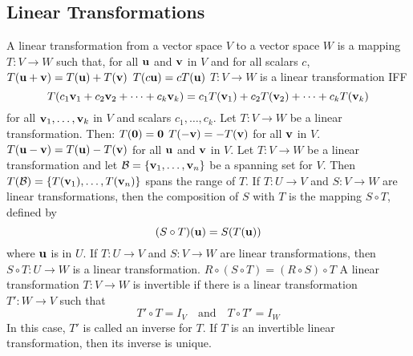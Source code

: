 \documentclass{article}
\begin{document}
        \subsection{Linear Transformations}
        \begin{outline}
            \1 A linear transformation from a vector space $V$ to a vector space $W$ is a mapping \(T:V\to W\) such that, for all \(\vb u\) and \(\vb v\) in $V$ and for all scalars $c$, 
                \2 \(T(\vb u+\vb v)=T(\vb u)+T(\vb v)\)
                \2 \(T(c\vb u)=cT(\vb u)\)
            \1 \(T:V\to W\) is a linear transformation IFF \[T(c_1\vb v_1+c_2\vb v_2+\cdots+c_k\vb v_k)=c_1T(\vb v_1)+c_2T(\vb v_2)+\cdots+c_kT(\vb v_k)\] for all \(\vb v_1,\ldots,\vb v_k\) in $V$ and scalars \(c_1,\ldots,c_k\). 
            \1 Let \(T:V\to W\) be a linear transformation. Then: 
                \2 \(T(\vb 0)=\vb 0\)
                \2 \(T(-\vb v)=-T(\vb v)\) for all \(\vb v\) in $V$. 
                \2 \(T(\vb u-\vb v)=T(\vb u)-T(\vb v)\) for all \(\vb u\) and \(\vb v\) in $V$. 
            \1 Let \(T:V\to W\) be a linear transformation and let \(\mathcal B=\{\vb v_1,\ldots,\vb v_n\}\) be a spanning set for $V$. Then \(T(\mathcal B)=\{T(\vb v_1),\ldots,T(\vb v_n)\}\) spans the range of $T$. 
            \1 If \(T:U\to V\) and \(S:V\to W\) are linear transformations, then the composition of $S$ with $T$ is the mapping \(S\circ T\), defined by \[(S\circ T)(\vb u)=S(T(\vb u))\] where \(\vb u\) is in $U$. 
            \1 If \(T:U\to V\) and \(S:V\to W\) are linear transformations, then \(S\circ T:U\to W\) is a linear transformation. 
            \1 \(R\circ(S\circ T)=(R\circ S)\circ T\)
            \1 A linear transformation \(T:V\to W\) is invertible if there is a linear transformation \(T':W\to V\) such that \[T'\circ T=I_V\quad\text{and}\quad T\circ T'=I_W\] In this case, \(T'\) is called an inverse for $T$. 
            \1 If $T$ is an invertible linear transformation, then its inverse is unique. 
        \end{outline}
\end{document}
